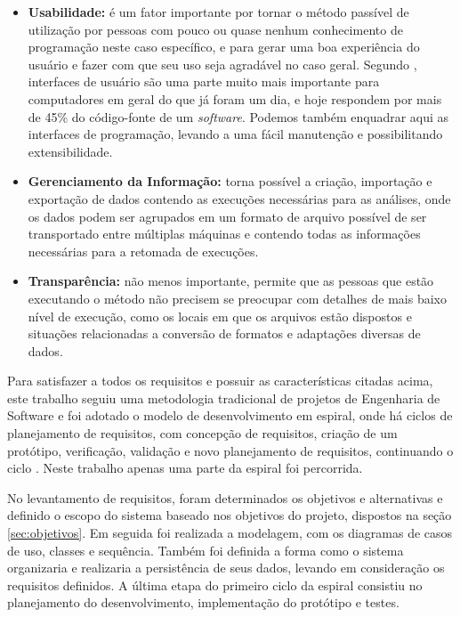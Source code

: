 \begin{itemize}
 \item{\textbf{Usabilidade:} é um fator importante por tornar o método passível de utilização por pessoas com pouco ou quase nenhum conhecimento de
programação neste caso específico, e para gerar uma boa experiência do usuário e fazer com que seu uso seja agradável no caso geral. Segundo
\cite{nielsen1993}, interfaces de usuário são uma parte muito mais importante para computadores em geral do que já foram um dia, e hoje respondem por mais
de 45\% do código-fonte de um \textit{software}. Podemos também enquadrar aqui as interfaces de programação, levando a uma fácil manutenção e possibilitando
extensibilidade.}
  \item{\textbf{Gerenciamento da Informação:} torna possível a criação, importação e exportação de dados contendo as execuções necessárias para as análises,
onde os dados podem ser agrupados em um formato de arquivo possível de ser transportado entre múltiplas máquinas e contendo todas as informações
necessárias para a retomada de execuções.}
  \item{\textbf{Transparência:} não menos importante, permite que as pessoas que estão executando o método não precisem se
preocupar com detalhes de mais baixo nível de execução, como os locais em que os arquivos estão dispostos e situações relacionadas a conversão de
formatos e adaptações diversas de dados.}
\end{itemize}

Para satisfazer a todos os requisitos e possuir as características citadas acima, este trabalho seguiu uma metodologia tradicional de projetos
de Engenharia de Software \cite{softeng2005} e foi adotado o modelo de desenvolvimento em espiral, onde há ciclos de planejamento de requisitos,
com concepção de requisitos, criação
de um protótipo, verificação, validação e novo planejamento de requisitos, continuando o ciclo \cite{boehm1986}. Neste trabalho apenas uma
parte da espiral foi percorrida.

No levantamento de requisitos, foram determinados os objetivos e alternativas e definido o escopo do sistema baseado nos objetivos do projeto,
dispostos na seção \ref{sec:objetivos}. Em seguida foi realizada a modelagem, com os diagramas de casos de uso, classes e sequência.
Também foi definida a forma como o sistema organizaria e realizaria a persistência de seus dados, levando em consideração os requisitos definidos.
A última etapa do primeiro ciclo da espiral consistiu no planejamento do desenvolvimento, implementação do protótipo e testes.

